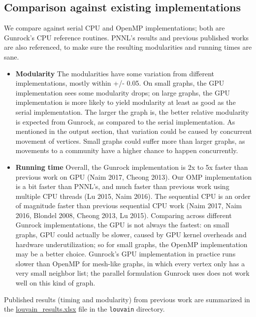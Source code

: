 \documentclass[10pt,oneside]{memoir}
\begin{document}
\hypertarget{comparison-against-existing-implementations-4}{%
\subsection{Comparison against existing
implementations}\label{comparison-against-existing-implementations-4}}

We compare against serial CPU and OpenMP implementations; both are
Gunrock's CPU reference routines. PNNL's results and previous published
works are also referenced, to make sure the resulting modularities and
running times are sane.

\begin{itemize}
\item
  \textbf{Modularity} The modularities have some variation from
  different implementations, mostly within +/- 0.05. On small graphs,
  the GPU implementation sees some modularity drops; on large graphs,
  the GPU implementation is more likely to yield modularity at least as
  good as the serial implementation. The larger the graph is, the better
  relative modularity is expected from Gunrock, as compared to the
  serial implementation. As mentioned in the output section, that
  variation could be caused by concurrent movement of vertices. Small
  graphs could suffer more than larger graphs, as movements to a
  community have a higher chance to happen concurrently.
\item
  \textbf{Running time} Overall, the Gunrock implementation is 2x to 5x
  faster than previous work on GPU (Naim 2017, Cheong 2013). Our OMP
  implementation is a bit faster than PNNL's, and much faster than
  previous work using multiple CPU threads (Lu 2015, Naim 2016). The
  sequential CPU is an order of magnitude faster than previous
  sequential CPU work (Naim 2017, Naim 2016, Blondel 2008, Cheong 2013,
  Lu 2015). Comparing across different Gunrock implementations, the GPU
  is not always the fastest: on small graphs, GPU could actually be
  slower, caused by GPU kernel overheads and hardware underutilization;
  so for small graphs, the OpenMP implementation may be a better choice.
  Gunrock's GPU implementation in practice runs slower than OpenMP for
  mesh-like graphs, in which every vertex only has a very small neighbor
  list; the parallel formulation Gunrock uses does not work well on this
  kind of graph.
\end{itemize}

Published results (timing and modularity) from previous work are
summarized in the
\href{attachments/louvain/louvain_results.xlsx}{louvain\_results.xlsx}
file in the \texttt{louvain} directory.
\end{document}

